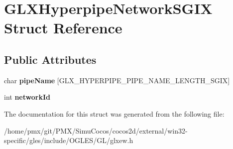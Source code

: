 \hypertarget{structGLXHyperpipeNetworkSGIX}{}\section{G\+L\+X\+Hyperpipe\+Network\+S\+G\+IX Struct Reference}
\label{structGLXHyperpipeNetworkSGIX}
\subsection*{Public Attributes}
\begin{DoxyCompactItemize}
\item 
\mbox{\label{structGLXHyperpipeNetworkSGIX_ad74834ae374ae01bf458f2e3bc989d76}} 
char {\bfseries pipe\+Name} \mbox{[}G\+L\+X\+\_\+\+H\+Y\+P\+E\+R\+P\+I\+P\+E\+\_\+\+P\+I\+P\+E\+\_\+\+N\+A\+M\+E\+\_\+\+L\+E\+N\+G\+T\+H\+\_\+\+S\+G\+IX\mbox{]}
\item 
\mbox{\label{structGLXHyperpipeNetworkSGIX_a81393053988b32fadb0b21615024add1}} 
int {\bfseries network\+Id}
\end{DoxyCompactItemize}


The documentation for this struct was generated from the following file\+:\begin{DoxyCompactItemize}
\item 
/home/pmx/git/\+P\+M\+X/\+Simu\+Cocos/cocos2d/external/win32-\/specific/gles/include/\+O\+G\+L\+E\+S/\+G\+L/glxew.\+h\end{DoxyCompactItemize}
